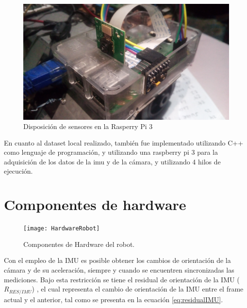 \begin{figure}[H]
	\centering		\includegraphics[width=0.7\linewidth]{imagenes/prototipo/Raspberry}
	\caption{Disposición de sensores en la Rasperry Pi 3}
	\label{imagen:Raspbery}
\end{figure}

En cuanto al dataset local realizado, también fue implementado utilizando C++ como lenguaje de programación, y utilizando una raspberry pi 3 para la adquisición de los datos de la imu y de la cámara, y utilizando 4 hilos de ejecución.


\section{Componentes de hardware}

\begin{figure}[H]
	\centering
	\texttt{[image: HardwareRobot]}
	\caption[Componentes de Hardware del robot]{Componentes de Hardware del robot.}
	\label{imagen:HardwareRobot}
\end{figure}



Con el empleo de la IMU es posible obtener los cambios de orientación de la cámara y de su aceleración, siempre y cuando se encuentren sincronizadas las mediciones. Bajo esta restricción se tiene el residual de orientación de la IMU (${R}_{RES/IMU}$) , el cual representa el cambio de orientación de la IMU entre el frame actual y el anterior, tal como se presenta en la ecuación \ref{eq:residualIMU}.

